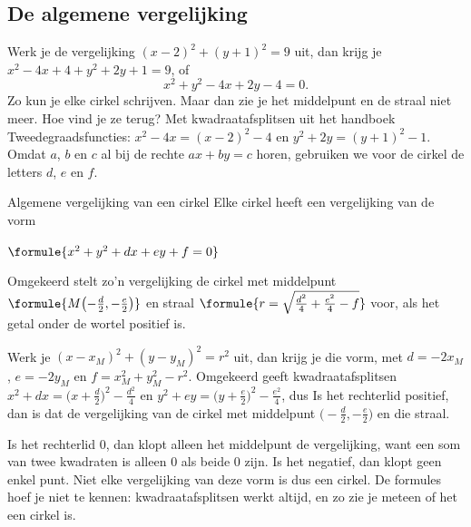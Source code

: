 \subsection{De algemene vergelijking}

Werk je de vergelijking $(x - 2)^2 + (y + 1)^2 = 9$ uit, dan krijg je $x^2 - 4x + 4 + y^2 + 2y + 1 = 9$, of
\[ x^2 + y^2 - 4x + 2y - 4 = 0. \]
Zo kun je elke cirkel schrijven. Maar dan zie je het middelpunt en de straal niet meer. Hoe vind je ze terug? Met kwadraatafsplitsen uit het handboek Tweedegraadsfuncties: $x^2 - 4x = (x - 2)^2 - 4$ en $y^2 + 2y = (y + 1)^2 - 1$. Omdat $a$, $b$ en $c$ al bij de rechte $ax + by = c$ horen, gebruiken we voor de cirkel de letters $d$, $e$ en $f$.

\begin{theorie}
\begin{stelling}{Algemene vergelijking van een cirkel}
Elke cirkel heeft een vergelijking van de vorm

\vspace{1mm}
\qquad $\formule{x^2 + y^2 + dx + ey + f = 0}$

\vspace{1mm}
Omgekeerd stelt zo'n vergelijking de cirkel met middelpunt $\formule{M\bigl(-\tfrac{d}{2}, -\tfrac{e}{2}\bigr)}$ en straal $\formule{r = \sqrt{\tfrac{d^2}{4} + \tfrac{e^2}{4} - f}}$ voor, als het getal onder de wortel positief is.
\end{stelling}
\begin{bewijs}
Werk je $(x - x_M)^2 + (y - y_M)^2 = r^2$ uit, dan krijg je die vorm, met $d = -2x_M$, $e = -2y_M$ en $f = x_M^2 + y_M^2 - r^2$. Omgekeerd geeft kwadraatafsplitsen $x^2 + dx = \bigl(x + \tfrac{d}{2}\bigr)^2 - \tfrac{d^2}{4}$ en $y^2 + ey = \bigl(y + \tfrac{e}{2}\bigr)^2 - \tfrac{e^2}{4}$, dus
Is het rechterlid positief, dan is dat de vergelijking van de cirkel met middelpunt $\bigl(-\tfrac{d}{2}, -\tfrac{e}{2}\bigr)$ en die straal.
\end{bewijs}
\end{theorie}

Is het rechterlid $0$, dan klopt alleen het middelpunt de vergelijking, want een som van twee kwadraten is alleen $0$ als beide $0$ zijn. Is het negatief, dan klopt geen enkel punt. Niet elke vergelijking van deze vorm is dus een cirkel. De formules hoef je niet te kennen: kwadraatafsplitsen werkt altijd, en zo zie je meteen of het een cirkel is.

